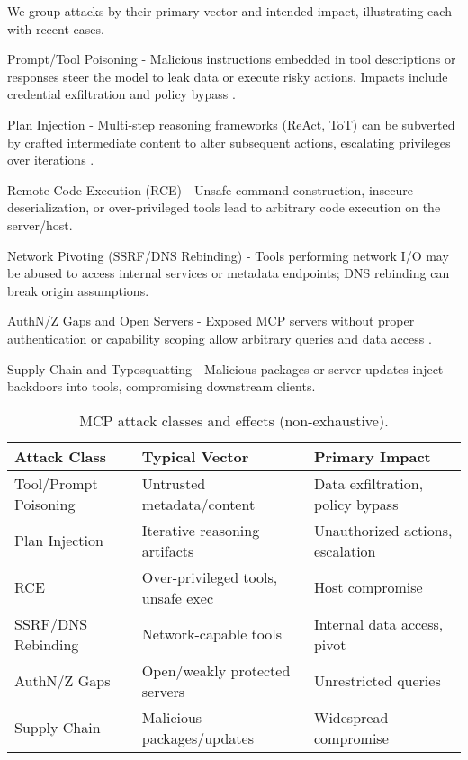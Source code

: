We group attacks by their primary vector and intended impact, illustrating each with recent cases.

Prompt/Tool Poisoning
- Malicious instructions embedded in tool descriptions or responses steer the model to leak data or execute risky actions. Impacts include credential exfiltration and policy bypass \cite{arXiv250323278,arXiv250812566}.

Plan Injection
- Multi-step reasoning frameworks (ReAct, ToT) can be subverted by crafted intermediate content to alter subsequent actions, escalating privileges over iterations \cite{arXiv250907595}.

Remote Code Execution (RCE)
- Unsafe command construction, insecure deserialization, or over-privileged tools lead to arbitrary code execution on the server/host.

Network Pivoting (SSRF/DNS Rebinding)
- Tools performing network I/O may be abused to access internal services or metadata endpoints; DNS rebinding can break origin assumptions.

AuthN/Z Gaps and Open Servers
- Exposed MCP servers without proper authentication or capability scoping allow arbitrary queries and data access \cite{MDPIElectronics3267}.

Supply-Chain and Typosquatting
- Malicious packages or server updates inject backdoors into tools, compromising downstream clients.

\begin{table}[h]
\centering
\begin{tabular}{@{}lll@{}}
\toprule
Attack Class & Typical Vector & Primary Impact \\
\midrule
Tool/Prompt Poisoning & Untrusted metadata/content & Data exfiltration, policy bypass \\
Plan Injection & Iterative reasoning artifacts & Unauthorized actions, escalation \\
RCE & Over-privileged tools, unsafe exec & Host compromise \\
SSRF/DNS Rebinding & Network-capable tools & Internal data access, pivot \\
AuthN/Z Gaps & Open/weakly protected servers & Unrestricted queries \\
Supply Chain & Malicious packages/updates & Widespread compromise \\
\bottomrule
\end{tabular}
\caption{MCP attack classes and effects (non-exhaustive).}
\label{tab:attacks}
\end{table}

